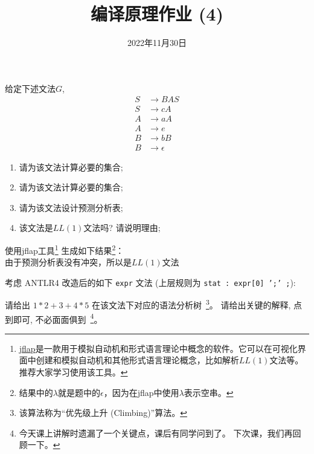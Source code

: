 \documentclass[a4paper, justified]{tufte-handout}
\title{编译原理作业 (4)}
\date{2022年11月30日}
\begin{document}
\maketitle
\noplagiarism %
\begin{abstract}
\end{abstract}
\beginrequired

\begin{problem}
  给定下述文法$G$,
  \begin{align}
    S &\to BAS \\[8pt]
    S &\to cA \\[8pt]
    A &\to aA \\[8pt]
    A &\to e \\[8pt]
    B &\to bB \\[8pt]
    B &\to \epsilon
  \end{align}

  \begin{enumerate}[(1)]
    \item 请为该文法计算必要的\first{}集合;
    \item 请为该文法计算必要的\follow{}集合;
    \item 请为该文法设计预测分析表;
    \item 该文法是$LL(1)$文法吗? 请说明理由;
  \end{enumerate}
\end{problem}

\begin{solution}
  使用jflap工具\footnote{
  	\href{https://www.jflap.org/jflaptmp/}{jflap}是一款用于模拟自动机和形式语言理论中概念的软件。它可以在可视化界面中创建和模拟自动机和其他形式语言理论概念，比如解析$LL(1)$文法等。推荐大家学习使用该工具。
  }
  生成如下结果\footnote{
  	结果中的$\lambda$就是题中的$\epsilon$，因为在jflap中使用$\lambda$表示空串。
  }：\\
  由于预测分析表没有冲突，所以是$LL(1)$文法
\end{solution}

\pagebreak
\begin{problem}
  考虑 ANTLR4 改造后的如下 \texttt{expr} 文法
  (上层规则为 \texttt{stat : expr[0] ';' ;}):


  \noindent 请给出 $1 \ast 2 + 3 + 4 \ast 5$
  在该文法下对应的语法分析树~\footnote{该算法称为``优先级上升 (Climbing)''算法。}。
  请给出关键的解释, 点到即可, 不必面面俱到~\footnote{
    今天课上讲解时遗漏了一个关键点，课后有同学问到了。
    下次课，我们再回顾一下。
  }。
\end{problem}
\end{document}
